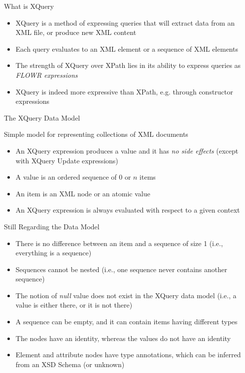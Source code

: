 \documentclass[svgnames]{beamer}
\begin{document}
\begin{frame}[fragile]{What is XQuery}
\begin{itemize}
	\item XQuery is a method of expressing queries that will extract data from an XML file, or produce new XML content
	\item Each query evaluates to an XML element or a sequence of XML elements
	\item The strength of XQuery over XPath lies in its ability to express queries as \emph{FLOWR expressions}
	\item XQuery is indeed more expressive than XPath, e.g. through constructor expressions
\end{itemize}
\end{frame}

\begin{frame}[fragile]{The XQuery Data Model}
\begin{block}{Simple model for representing collections of XML documents}
\begin{itemize}
	\item An XQuery expression produces a value and it has \emph{no side effects} (except with XQuery Update expressions)
	\item A value is an ordered sequence of 0 or $n$ items
	\item An item is an XML node or an atomic value
	\item An XQuery expression is always evaluated with respect to a given context
\end{itemize}
\end{block}
\end{frame}

\begin{frame}[fragile]{Still Regarding the Data Model}
\begin{itemize}
	\item There is no difference between an item and a sequence of size 1 (i.e., everything is a sequence)
	\item Sequences cannot be nested (i.e., one sequence never contains another sequence)
	\item The notion of {\it null} value does not exist in the XQuery data model (i.e., a value is either there, or it is not there)
	\item A sequence can be empty, and it can contain items having different types
	\item The nodes have an identity, whereas the values do not have an identity
	\item Element and attribute nodes have type annotations, which can be inferred from an XSD Schema (or unknown)
\end{itemize}
\end{frame}
\end{document}
